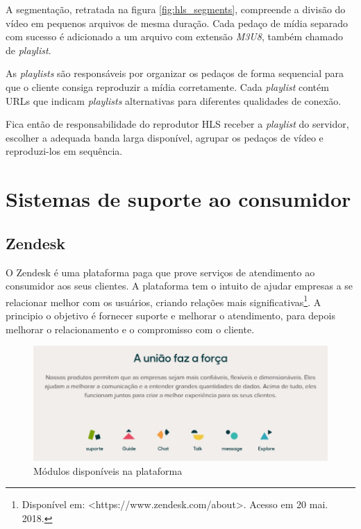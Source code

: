 A segmentação, retratada na figura \ref{fig:hls_segments}, compreende a divisão do vídeo em pequenos arquivos  de mesma duração. Cada pedaço de mídia separado com sucesso é adicionado a um arquivo com extensão \textit{M3U8}, também chamado de \textit{playlist}. 

As \textit{playlists} são responsáveis por organizar os pedaços de forma sequencial para que o cliente consiga reproduzir a mídia corretamente. Cada \textit{playlist} contém URLs que indicam \textit{playlists} alternativas para diferentes qualidades de conexão. 

Fica então de responsabilidade do reprodutor HLS receber a \textit{playlist} do servidor, escolher a adequada banda larga disponível, agrupar os pedaços de vídeo e reproduzi-los em sequência. 

\section{Sistemas de suporte ao consumidor}

\subsection{Zendesk}

O Zendesk é uma plataforma paga que prove serviços de atendimento ao consumidor aos seus clientes. A plataforma tem o intuito de ajudar empresas a se relacionar melhor com os usuários, criando relações mais significativas\footnote{Disponível em: <https://www.zendesk.com/about>. Acesso em 20 mai. 2018.}. A principio o objetivo é fornecer suporte e melhorar o atendimento, para depois melhorar o relacionamento e o compromisso com o cliente.

\begin{figure}[ht!]
	\centering
		\includegraphics[scale=0.45]{figures/zendesk-modules.jpg} 
	\caption{Módulos disponíveis na plataforma}
	\label{fig:zendesk_modules}
\end{figure}

